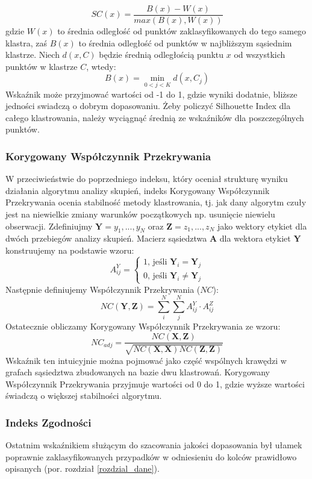\documentclass{article}
\begin{document}
\[SC(x) = \frac{B(x) - W(x)}{max(B(x),W(x))}\]
gdzie $W(x)$ to średnia odległość od punktów zaklasyfikowanych do tego samego klastra, zaś $B(x)$ to średnia odległość od punktów w najbliższym sąsiednim klastrze\citep{Rousseeuw1987}.
Niech $d(x, C)$ będzie średnią odległością punktu $x$ od wszystkich punktów w klastrze $C$, wtedy:
\[B(x) = \min_{0 < j < K} d(x, C_j)\]
Wskaźnik może przyjmować wartości od -1 do 1, gdzie wyniki dodatnie, bliższe jedności swiadczą o dobrym dopasowaniu.
Żeby policzyć Silhouette Index dla całego klastrowania, należy wyciągnąć średnią ze wskaźników dla poszczególnych punktów.

\subsubsection{Korygowany Współczynnik Przekrywania}
\label{roz_neigh_coeff}
W przeciwieństwie do poprzedniego indeksu, który oceniał strukturę wyniku działania algorytmu analizy skupień, indeks Korygowany Współczynnik Przekrywania ocenia stabilność metody klastrowania\citep{Ben-Hur2002}, tj. jak dany algorytm czuły jest na niewielkie zmiany warunków początkowych np. usunięcie niewielu obserwacji.
Zdefiniujmy $\textbf{Y} = {y_1, ..., y_N}$ oraz $\textbf{Z} = {z_1, ..., z_N}$ jako wektory etykiet dla dwóch przebiegów analizy skupień. Macierz sąsiedztwa $\textbf{A}$ dla wektora etykiet $\textbf{Y}$ konstruujemy na podstawie wzoru:
%
$$A^Y_{ij} = \begin{cases}
	1\text{, jeśli} \textbf{ Y}_i = \textbf{Y}_j \\
	0\text{, jeśli}\textbf{ Y}_i \neq \textbf{Y}_j
\end{cases}$$
%
Następnie definiujemy Współczynnik Przekrywania ($NC$):
$$NC(\textbf{Y}, \textbf{Z}) = \sum_i^N\sum_j^N A^Y_{ij} \cdot A^Z_{ij}$$
%
Ostatecznie obliczamy Korygowany Współczynnik Przekrywania ze wzoru:
$$NC_{adj} = \frac{NC(\textbf{X},\textbf{Z})}{\sqrt{NC(\textbf{X},\textbf{X})NC(\textbf{Z},\textbf{Z})}}$$
%
Wskaźnik ten intuicyjnie można pojmować jako część wspólnych krawędzi w grafach sąsiedztwa zbudowanych na bazie dwu klastrowań.
Korygowany Współczynnik Przekrywania przyjmuje wartości od 0 do 1, gdzie wyższe wartości świadczą o większej stabilności algorytmu.
\subsubsection{Indeks Zgodności}
Ostatnim wskaźnikiem służącym do szacowania jakości dopasowania był ułamek poprawnie zaklasyfikowanych przypadków w odniesieniu do kolców prawidłowo opisanych (por. rozdział \ref{rozdzial_dane}).
\end{document}

